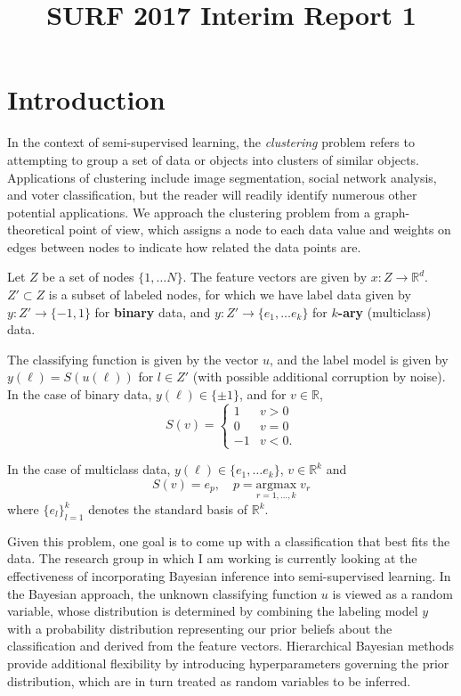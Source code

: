 \documentclass{siamart1116}
\title{SURF 2017 Interim Report 1}
\author{\TheAuthors}
\date{}
\begin{document}
\maketitle
\setlength{\unitlength}{1in}
\setlength{\parindent}{0in}

\section{Introduction}
In the context of semi-supervised learning, the \textit{clustering} problem refers to attempting to group a set of data or objects into clusters of similar objects. Applications of clustering include image segmentation, social network analysis, and voter classification, but the reader will readily identify numerous other potential applications. We approach the clustering problem from a graph-theoretical point of view, which assigns a node to each data value and weights on edges between nodes to indicate how related the data points are.

Let $Z$ be a set of nodes $\{1, \ldots N\}$. The feature vectors are given by $x : Z \rightarrow \mathbb{R}^d$. $Z' \subset Z$ is a subset of labeled nodes, for which we have label data given by $y : Z' \to \{-1, 1\}$ for {\bf binary} data, and $y : Z' \to \{e_1, \ldots e_k\}$ for {\bf $k$-ary} (multiclass) data.


The classifying function is given by the vector $u$, and the label model is given by $y(\ell) = S(u(\ell))$ for $l \in Z'$ (with possible additional corruption by noise). In the case of binary data, $y(\ell) \in \{\pm 1\}$, and for $v \in \mathbb{R}$,
\[
S(v) = \begin{cases}
1 & v>0\\
0 & v=0\\
-1 & v<0.
\end{cases}
\]

In the case of multiclass data, $y(\ell) \in \{e_1, \ldots e_k\}$, $v \in \mathbb{R}^k$ and
\[
S(v) = e_p, \quad p = \underset{r =1,\ldots,k}{\mathrm{argmax}}\;v_r
\]
where $\{e_l\}_{l=1}^k$ denotes the standard basis of $\mathbb{R}^k$.

Given this problem, one goal is to come up with a classification that best fits the data. The research group in which I am working is currently looking at the effectiveness of incorporating Bayesian inference into semi-supervised learning. In the Bayesian approach, the unknown classifying function $u$ is viewed as a random variable, whose distribution is determined by combining the labeling model $y$ with a probability distribution representing our prior beliefs about the classification and derived from the feature vectors. Hierarchical Bayesian methods provide additional flexibility by introducing hyperparameters governing the prior distribution, which are in turn treated as random variables to be inferred.
\end{document}
